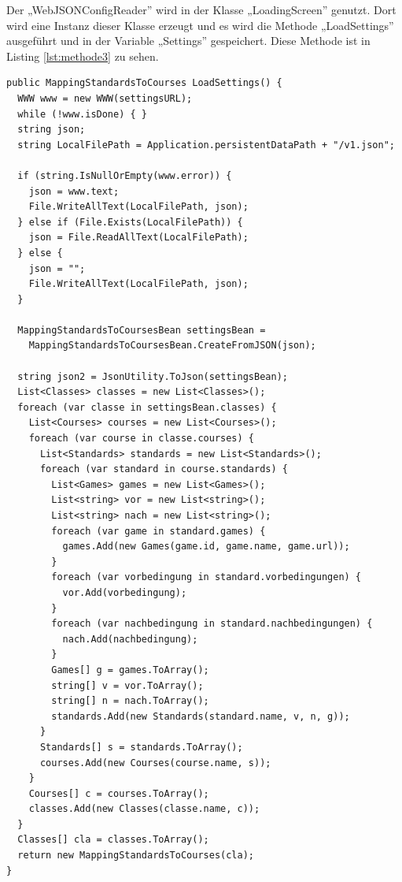 				Der „WebJSONConfigReader” wird in der Klasse „LoadingScreen” genutzt. Dort wird eine Instanz dieser Klasse erzeugt und es wird die Methode „LoadSettings” ausgeführt und in der Variable „Settings” gespeichert. Diese Methode ist in Listing \ref{lst:methode3} zu sehen.

			\begin{scriptsize}
				\lstset{
					float,
					caption=Methode: LoadSettings, 
					language=[Sharp]C, 
					frame=single,  
					showstringspaces=false, 
					showspaces=false, 
					numbers=left, 
					captionpos=b, 
					belowcaptionskip=4pt,
					basicstyle=\ttfamily
				} 
				\begin{lstlisting}[label=lst:methode3]
public MappingStandardsToCourses LoadSettings() {
  WWW www = new WWW(settingsURL);
  while (!www.isDone) { }
  string json;
  string LocalFilePath = Application.persistentDataPath + "/v1.json";
	
  if (string.IsNullOrEmpty(www.error)) {
    json = www.text;
    File.WriteAllText(LocalFilePath, json);
  } else if (File.Exists(LocalFilePath)) {
    json = File.ReadAllText(LocalFilePath);
  } else {
    json = "";                
    File.WriteAllText(LocalFilePath, json);
  }

  MappingStandardsToCoursesBean settingsBean = 
    MappingStandardsToCoursesBean.CreateFromJSON(json);
  
  string json2 = JsonUtility.ToJson(settingsBean);	
  List<Classes> classes = new List<Classes>();
  foreach (var classe in settingsBean.classes) {
    List<Courses> courses = new List<Courses>();
    foreach (var course in classe.courses) {
      List<Standards> standards = new List<Standards>();
      foreach (var standard in course.standards) {
        List<Games> games = new List<Games>();
        List<string> vor = new List<string>();
        List<string> nach = new List<string>();
        foreach (var game in standard.games) {
          games.Add(new Games(game.id, game.name, game.url));
        }
        foreach (var vorbedingung in standard.vorbedingungen) {
          vor.Add(vorbedingung);
        }
        foreach (var nachbedingung in standard.nachbedingungen) {
          nach.Add(nachbedingung);
        }
        Games[] g = games.ToArray();
        string[] v = vor.ToArray();
        string[] n = nach.ToArray();
        standards.Add(new Standards(standard.name, v, n, g));
      }
      Standards[] s = standards.ToArray();
      courses.Add(new Courses(course.name, s));
    }
    Courses[] c = courses.ToArray();
    classes.Add(new Classes(classe.name, c));
  }
  Classes[] cla = classes.ToArray();
  return new MappingStandardsToCourses(cla);
}
				\end{lstlisting}
			\end{scriptsize}

